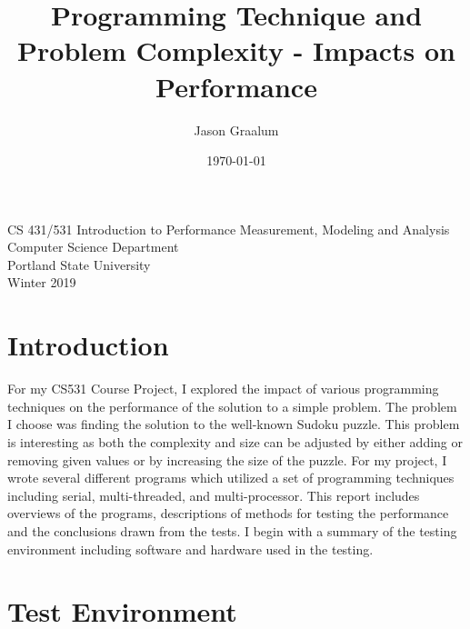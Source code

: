 \documentclass[11pt, a4paper]{article} %
\title{Programming Technique and Problem Complexity - Impacts on Performance} %
\author{
Jason Graalum %
  }
\date{\small \today} %
\begin{document}
%

\maketitle %

\begin{center} %
   CS 431/531 Introduction to Performance Measurement, Modeling and Analysis\\
   Computer Science Department\\
   Portland State University \\
   Winter 2019
\end{center}

\setcounter{page}{1} %

\section{Introduction} %
For my CS531 Course Project, I explored the impact of various programming techniques on the performance of the solution to a simple problem.  The problem I choose was finding the solution to the well-known Sudoku puzzle. This problem is interesting as both the complexity and size can be adjusted by either adding or removing given values or by increasing the size of the puzzle.  For my project, I wrote several different programs which utilized a set of programming techniques including serial, multi-threaded, and multi-processor.  This report includes overviews of the programs, descriptions of methods for testing the performance and the conclusions drawn from the tests. I begin with a summary of the testing environment including software and hardware used in the testing.

\section{Test Environment} %
\end{document}
